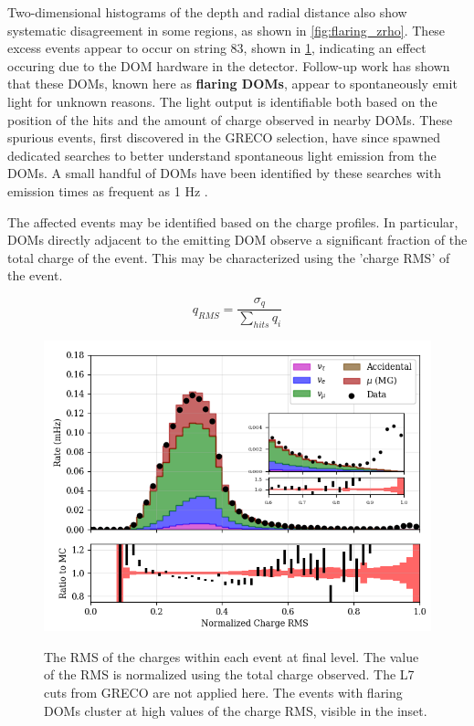 Two-dimensional histograms of the depth and radial distance also show systematic disagreement in some regions, as shown in \ref{fig:flaring_zrho}.
These excess events appear to occur on string 83, shown in \ref{fig:flaring_xy}, indicating an effect occuring due to the DOM hardware in the detector.
Follow-up work has shown that these DOMs, known here as \textbf{flaring DOMs}, appear to spontaneously emit light for unknown reasons. 
The light output is identifiable both based on the position of the hits and the amount of charge observed in nearby DOMs.
These spurious events, first discovered in the GRECO selection, have since spawned dedicated searches to better understand spontaneous light emission from the DOMs.
A small handful of DOMs have been identified by these searches with emission times as frequent as 1 Hz .

The affected events may be identified based on the charge profiles. 
In particular, DOMs directly adjacent to the emitting DOM observe a significant fraction of the total charge of the event.
This may be characterized using the 'charge RMS' of the event.

\label{eqn:charge_rms}
\begin{equation}
	q_{RMS} = \frac{\sigma_q}{\sum_{hits}{q_i}}
\end{equation}

\begin{center}
\begin{figure}
	\includegraphics[width=0.9\linewidth]{L7_charge_rms_normalized.png}
\label{fig:flaring_xy}
\caption{The RMS of the charges within each event at final level. The value of the RMS is normalized using the total charge observed. The L7 cuts from GRECO are not applied here. The events with flaring DOMs cluster at high values of the charge RMS, visible in the inset.}
\end{figure}
\end{center}

